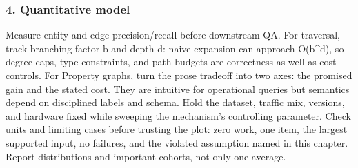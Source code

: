 \subsubsection*{4. Quantitative model}
Measure entity and edge precision/recall before downstream QA. For traversal, track branching factor b and depth d: naive expansion can approach O(b\textasciicircum{}d), so degree caps, type constraints, and path budgets are correctness as well as cost controls.
For Property graphs, turn the prose tradeoff into two axes: the promised gain and the stated cost. They are intuitive for operational queries but semantics depend on disciplined labels and schema. Hold the dataset, traffic mix, versions, and hardware fixed while sweeping the mechanism's controlling parameter.
Check units and limiting cases before trusting the plot: zero work, one item, the largest supported input, no failures, and the violated assumption named in this chapter. Report distributions and important cohorts, not only one average.
